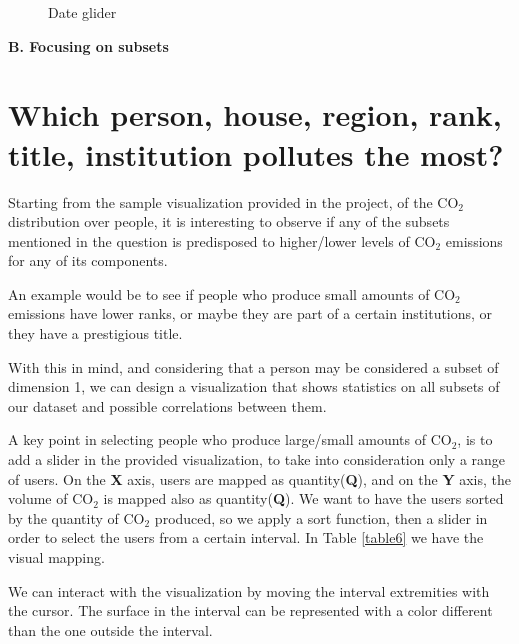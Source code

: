 \documentclass{article}
\begin{document}
\begin{figure}[H]
	\centering
	\caption{Date glider}
	\label{fig:fav_dest_glider}
\end{figure}



\textbf{\Large{B. Focusing on subsets}}\\
\section{Which person, house, region, rank, title, institution pollutes the most?}

Starting from the sample visualization provided in the project, of the CO${_2}$ distribution over people, it is interesting to observe if any of the subsets mentioned in the question is predisposed to higher/lower levels of CO${_2}$ emissions for any of its components.

An example would be to see if people who produce small amounts of CO${_2}$ emissions have lower ranks, or maybe they are part of a certain institutions, or they have a prestigious title.

With this in mind, and considering that a person may be considered a subset of dimension 1, we can design a visualization that shows statistics on all subsets of our dataset and possible correlations between them.

A key point in selecting people who produce large/small amounts of CO${_2}$, is to add a slider in the provided visualization, to take into consideration only a range of users. On the \textbf{X} axis, users are mapped as quantity(\textbf{Q}), and on the \textbf{Y} axis, the volume of CO${_2}$ is mapped also as quantity(\textbf{Q}). We want to have the users sorted by the quantity of CO${_2}$ produced, so we apply a sort function, then a slider in order to select the users from a certain interval. In Table \ref{table6} we have the visual mapping.

We can interact with the visualization by moving the interval extremities with the cursor. The surface in the interval can be represented with a color different than the one outside the interval.
 
\end{document}
